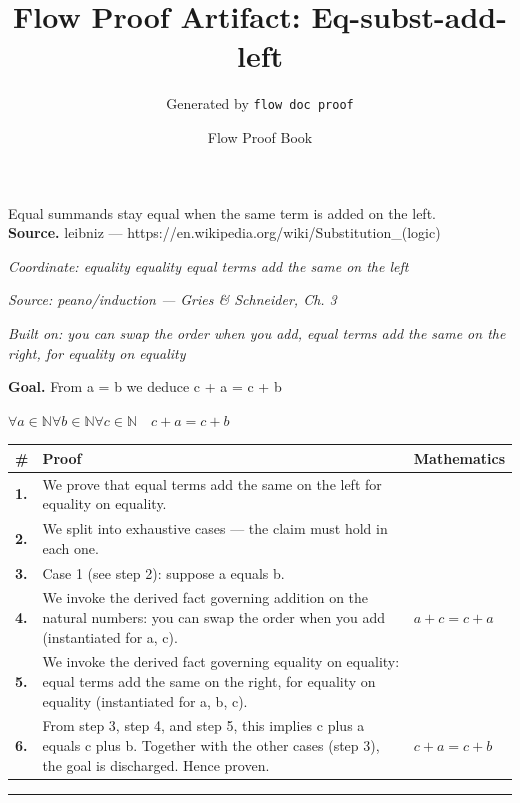 \documentclass[11pt]{article}
\title{Flow Proof Artifact: Eq-subst-add-left}
\author{Generated by \texttt{flow doc proof}}
\date{Flow Proof Book}
\theoremstyle{definition}
\begin{document}
\maketitle
Equal summands stay equal when the same term is added on the left.\\[0.5em]
\textbf{Source.} leibniz — https://en.wikipedia.org/wiki/Substitution\_(logic)\\[0.5em]
\bigskip
{}\par
\smallskip\noindent\textit{Coordinate: equality \cdot equality \cdot equal terms add the same on the left}\par
\smallskip\noindent\textit{Source: peano/induction — Gries \& Schneider, Ch. 3}\par
\smallskip\noindent\textit{Built on: you can swap the order when you add, equal terms add the same on the right, for equality on equality}\par
\medskip
\noindent\textbf{Goal.} From a = b we deduce c + a = c + b\par
\noindent$\displaystyle \forall a \in \mathbb{N} \forall b \in \mathbb{N} \forall c \in \mathbb{N}\quad c + a = c + b$\par
\medskip
\noindent
\begin{tabular}{@{} >{\raggedright\arraybackslash}p{} >{\raggedright\arraybackslash}p{} >{\raggedleft\arraybackslash}p{} @{}}
\textbf{\#} & \textbf{Proof} & \textbf{Mathematics} \\
\midrule
\textbf{1.} & We prove that equal terms add the same on the left for equality on equality. & \\[0.45em]
\textbf{2.} & We split into exhaustive cases — the claim must hold in each one. & \\[0.45em]
\textbf{3.} & Case 1 (see step 2): suppose a  equals  b. & \\[0.45em]
\textbf{4.} & We invoke the derived fact governing addition on the natural numbers: you can swap the order when you add (instantiated for a, c). & $\displaystyle a + c = c + a$ \\[0.45em]
\textbf{5.} & We invoke the derived fact governing equality on equality: equal terms add the same on the right, for equality on equality (instantiated for a, b, c). & \\[0.45em]
\textbf{6.} & From step 3, step 4, and step 5, this implies c plus a equals c plus b. Together with the other cases (step 3), the goal is discharged. Hence proven. & $\displaystyle c + a = c + b$ \\[0.45em]
\bottomrule
\end{tabular}
\label{thm:Eq-equality-equal_terms_add_the_same_on_the_left}
\par\medskip\hrule
\end{document}
